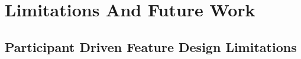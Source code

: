






\section{Limitations And Future Work}

\subsection{Participant Driven Feature Design Limitations}



